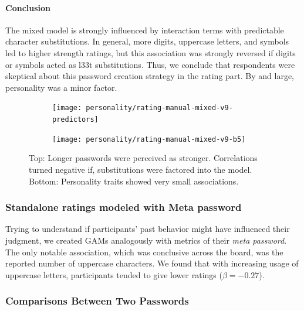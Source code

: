 \paragraph{Conclusion} The mixed model is strongly influenced by interaction terms with predictable character substitutions. In general, more digits, uppercase letters, and symbols led to higher strength ratings, but this association was strongly reversed if digits or symbols acted as l33t substitutions. Thus, we conclude that respondents were skeptical about this password creation strategy in the rating part. By and large, personality was a minor factor.


\begin{figure}[htbp]
	\centering
	\begin{subfigure}[t]{\linewidth}
		\texttt{[image: personality/rating-manual-mixed-v9-predictors]}
	\end{subfigure}
	\begin{subfigure}[b]{\linewidth}
	\texttt{[image: personality/rating-manual-mixed-v9-b5]}
	\end{subfigure}
	\caption{\label{fig:personality:study2:rating-mixed-model} Top: Longer passwords were perceived as stronger. Correlations turned negative if, substitutions were factored into the model. Bottom: Personality traits showed very small associations.}
\end{figure}

\subsubsection{Standalone ratings modeled with Meta password}
Trying to understand if participants' past behavior might have influenced their judgment, we created GAMs analogously with metrics of their \textit{meta password}. The only notable association, which was conclusive across the board, was the reported number of uppercase characters. We found that with increasing usage of uppercase letters, participants tended to give lower ratings ($\beta=-0.27$). 

\subsubsection{Comparisons Between Two Passwords}

